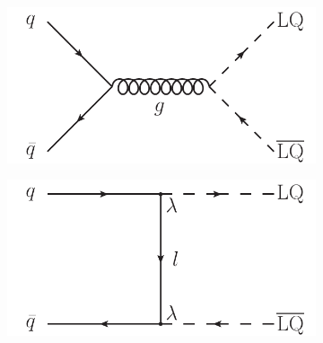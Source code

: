 \begin{figure}
  \centering
  \begin{subfigure}[b]{0.45\textwidth}
    \includegraphics[width=\textwidth]{tex/theory/fig/LO_FD_LQ_pair_a}
    \caption{}
    \label{fig:feynman_LO_LQ_pair_a}
  \end{subfigure}
  \begin{subfigure}[b]{0.45\textwidth}
    \includegraphics[width=\textwidth]{tex/theory/fig/LO_FD_LQ_pair_b}
    \caption{}
    \label{fig:feynman_LO_LQ_pair_b}
  \end{subfigure}


\end{figure}
